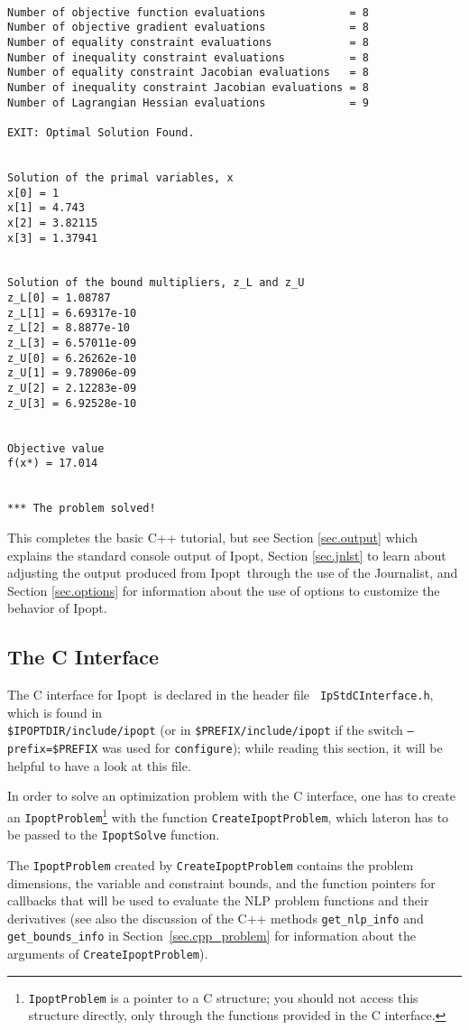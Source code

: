 \documentclass[letter,10pt]{article}
\newcommand{\Ipopt}{{\sc Ipopt}}
\begin{document}
\begin{footnotesize}
\begin{verbatim}
 
Number of objective function evaluations             = 8
Number of objective gradient evaluations             = 8
Number of equality constraint evaluations            = 8
Number of inequality constraint evaluations          = 8
Number of equality constraint Jacobian evaluations   = 8
Number of inequality constraint Jacobian evaluations = 8
Number of Lagrangian Hessian evaluations             = 9
 
EXIT: Optimal Solution Found.
 
 
Solution of the primal variables, x
x[0] = 1
x[1] = 4.743
x[2] = 3.82115
x[3] = 1.37941
 
 
Solution of the bound multipliers, z_L and z_U
z_L[0] = 1.08787
z_L[1] = 6.69317e-10
z_L[2] = 8.8877e-10
z_L[3] = 6.57011e-09
z_U[0] = 6.26262e-10
z_U[1] = 9.78906e-09
z_U[2] = 2.12283e-09
z_U[3] = 6.92528e-10
 
 
Objective value
f(x*) = 17.014
 
 
*** The problem solved!
\end{verbatim}
\end{footnotesize}

This completes the basic C++ tutorial, but see Section
\ref{sec.output} which explains the standard console output of \Ipopt,
Section \ref{sec.jnlst} to learn about adjusting the output produced
from \Ipopt\ through the use of the Journalist, and Section
\ref{sec.options} for information about the use of options to
customize the behavior of \Ipopt.

\subsection{The C Interface}\label{sec.cinterface}
The C interface for \Ipopt\ is declared in the header file {\tt
  IpStdCInterface.h}, which is found in\\
\texttt{\$IPOPTDIR/include/ipopt} (or in
\texttt{\$PREFIX/include/ipopt} if the switch
\texttt{--prefix=\$PREFIX} was used for {\tt configure}); while
reading this section, it will be helpful to have a look at this file.

In order to solve an optimization problem with the C interface, one
has to create an {\tt IpoptProblem}\footnote{{\tt IpoptProblem} is a
  pointer to a C structure; you should not access this structure
  directly, only through the functions provided in the C interface.}
with the function {\tt CreateIpoptProblem}, which lateron has to be
passed to the {\tt IpoptSolve} function.

The {\tt IpoptProblem} created by {\tt CreateIpoptProblem} contains
the problem dimensions, the variable and constraint bounds, and the
function pointers for callbacks that will be used to evaluate the NLP
problem functions and their derivatives (see also the discussion of
the C++ methods {\tt get\_nlp\_info} and {\tt get\_bounds\_info} in
Section~\ref{sec.cpp_problem} for information about the arguments of
{\tt CreateIpoptProblem}).
\end{document}
